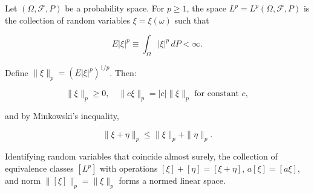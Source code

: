 Let $(\Omega, \mathcal{F}, P)$ be a probability space. For $p \geq 1$, the space $L^p = L^p(\Omega, \mathcal{F}, P)$ is the collection of random variables $\xi = \xi(\omega)$ such that

$$E|\xi|^p \equiv \int_{\Omega} |\xi|^p \, dP < \infty.$$

Define $\|\xi\|_p = (E|\xi|^p)^{1/p}$. Then:

$$\|\xi\|_p \geq 0, \quad \|c\xi\|_p = |c| \|\xi\|_p \text{ for constant } c,$$

and by Minkowski's inequality,

$$\|\xi + \eta\|_p \leq \|\xi\|_p + \|\eta\|_p.$$

Identifying random variables that coincide almost surely, the collection of equivalence classes $[L^p]$ with operations $[\xi] + [\eta] = [\xi + \eta]$, $a[\xi] = [a\xi]$, and norm $\|[\xi]\|_p = \|\xi\|_p$ forms a normed linear space.
